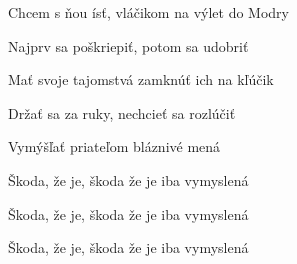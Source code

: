 \begin{song}
\bigskip

Chcem s ňou ísť, vláčikom na výlet do Modry \par
Najprv sa poškriepiť, potom sa udobriť \par
Mať svoje tajomstvá zamknúť ich na kľúčik \par
Držať sa za ruky, nechcieť sa rozlúčiť \par

\bigskip

Vymýšľať priateľom bláznivé mená \par
Škoda, že je, škoda že je iba vymyslená \par
Škoda, že je, škoda že je iba vymyslená \par
Škoda, že je, škoda že je iba vymyslená \par

\end{song}
